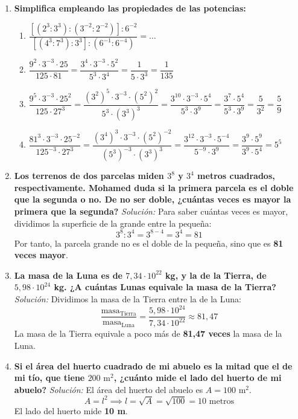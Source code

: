 \documentclass[a4paper,12pt]{article}
\begin{document}
\begin{enumerate}
    \item \textbf{Simplifica empleando las propiedades de las potencias:}
        \begin{enumerate}[label=\alph*)]
            \item $\dfrac{[(2^{3}:3^{3}):(3^{-2}:2^{-2})]:6^{-2}}{[(4^{3}:7^{3}):3^{3}]:(6^{-1}:6^{-4})} = \dots$
            \item $\dfrac{9^{2} \cdot 3^{-3} \cdot 25}{125 \cdot 81} = \dfrac{3^{4} \cdot 3^{-3} \cdot 5^{2}}{5^{3} \cdot 3^{4}} = \dfrac{1}{5 \cdot 3^{3}} = \dfrac{1}{135}$
            \item $\dfrac{9^{5} \cdot 3^{-3} \cdot 25^{2}}{125 \cdot 27^{3}} = \dfrac{(3^{2})^{5} \cdot 3^{-3} \cdot (5^{2})^{2}}{5^{3} \cdot (3^{3})^{3}} = \dfrac{3^{10} \cdot 3^{-3} \cdot 5^{4}}{5^{3} \cdot 3^{9}} = \dfrac{3^{7} \cdot 5^{4}}{5^{3} \cdot 3^{9}} = \dfrac{5}{3^{2}} = \dfrac{5}{9}$
            \item $\dfrac{81^{3} \cdot 3^{-3} \cdot 25^{-2}}{125^{-3} \cdot 27^{3}} = \dfrac{(3^{4})^{3} \cdot 3^{-3} \cdot (5^{2})^{-2}}{(5^{3})^{-3} \cdot (3^{3})^{3}} = \dfrac{3^{12} \cdot 3^{-3} \cdot 5^{-4}}{5^{-9} \cdot 3^{9}} = \dfrac{3^{9} \cdot 5^{9}}{3^{9} \cdot 5^{4}} = 5^{5}$
        \end{enumerate}

    \item \textbf{Los terrenos de dos parcelas miden $3^{8}$ y $3^{4}$ metros cuadrados, respectivamente. Mohamed duda si la primera parcela es el doble que la segunda o no. De no ser doble, ¿cuántas veces es mayor la primera que la segunda?}
        \textit{Solución:}
        Para saber cuántas veces es mayor, dividimos la superficie de la grande entre la pequeña:
        \[
        3^{8} : 3^{4} = 3^{8-4} = 3^{4} = 81
        \]
        Por tanto, la parcela grande no es el doble de la pequeña, sino que es \textbf{81 veces mayor}.

    \item \textbf{La masa de la Luna es de $7,34 \cdot 10^{22}$ kg, y la de la Tierra, de $5,98 \cdot 10^{24}$ kg. ¿A cuántas Lunas equivale la masa de la Tierra?}
        \textit{Solución:}
        Dividimos la masa de la Tierra entre la de la Luna:
        \[
        \dfrac{\text{masa}_{\text{Tierra}}}{\text{masa}_{\text{Luna}}} = \dfrac{5,98 \cdot 10^{24}}{7,34 \cdot 10^{22}} \approx 81,47
        \]
        La masa de la Tierra equivale a poco más de \textbf{81,47 veces} la masa de la Luna.

    \item \textbf{Si el área del huerto cuadrado de mi abuelo es la mitad que el de mi tío, que tiene $200\text{ m}^{2}$, ¿cuánto mide el lado del huerto de mi abuelo?}
        \textit{Solución:}
        El área del huerto del abuelo es $A = 100\text{ m}^{2}$.
        \[
        A = l^{2} \implies l = \sqrt{A} = \sqrt{100} = 10\text{ metros}
        \]
        El lado del huerto mide \textbf{10 m}.


\end{enumerate}
\end{document}
